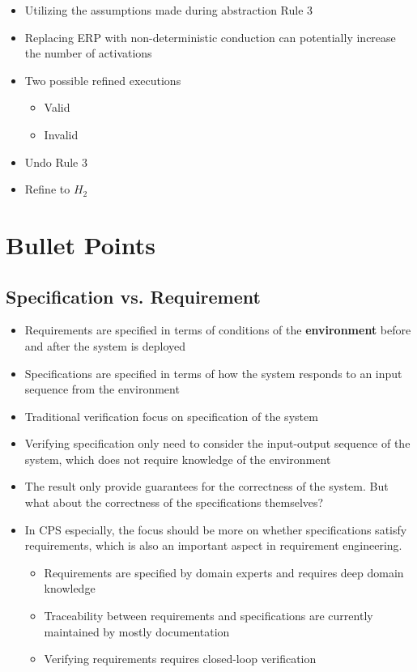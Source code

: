 \documentclass{llncs}
\begin{document}
\begin{itemize}
	\item Utilizing the assumptions made during abstraction Rule 3
    \item Replacing ERP with non-deterministic conduction can potentially increase the number of activations
    \item Two possible refined executions
    
\begin{itemize}
	\item Valid 
    \item Invalid
\end{itemize}
    \item Undo Rule 3
    \item Refine to $H_2$
\end{itemize}
\newpage
\section{Bullet Points}
\subsection{Specification vs. Requirement}
\begin{itemize}
	\item Requirements are specified in terms of conditions of the \textbf{environment} before and after the system is deployed
    \item Specifications are specified in terms of how the system responds to an input sequence from the environment
    \item Traditional verification focus on specification of the system
    \item Verifying specification only need to consider the input-output sequence of the system, which does not require knowledge of the environment
    \item The result only provide guarantees for the correctness of the system. But what about the correctness of the specifications themselves?
   
    \item In CPS especially, the focus should be more on whether specifications satisfy requirements, which is also an important aspect in requirement engineering.
    
    \begin{itemize}
        
        \item Requirements are specified by domain experts and requires deep domain knowledge 
        \item Traceability between requirements and specifications are currently maintained by mostly documentation
        \item Verifying requirements requires closed-loop verification
    \end{itemize}
\end{itemize}
\end{document}
